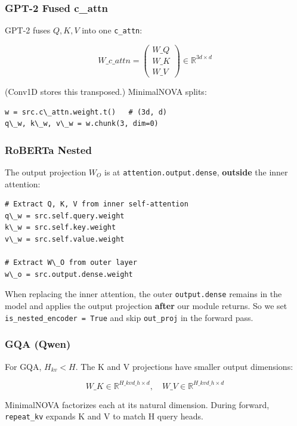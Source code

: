 \subsubsection{GPT-2 Fused c\_attn}

GPT-2 fuses $Q, K, V$ into one \texttt{c\_attn}:

\[
W\_{c\_attn} = \begin{pmatrix} W\_Q \\ W\_K \\ W\_V \end{pmatrix} \in \mathbb{R}^{3d \times d}
\tag{4.6}
\]

(Conv1D stores this transposed.) MinimalNOVA splits:

\begin{lstlisting}
w = src.c\_attn.weight.t()   # (3d, d)
q\_w, k\_w, v\_w = w.chunk(3, dim=0)
\end{lstlisting}

\subsubsection{RoBERTa Nested}

The output projection $W_O$ is at \texttt{attention.output.dense}, \textbf{outside} the 
inner attention:

\begin{lstlisting}
# Extract Q, K, V from inner self-attention
q\_w = src.self.query.weight
k\_w = src.self.key.weight
v\_w = src.self.value.weight

# Extract W\_O from outer layer
w\_o = src.output.dense.weight
\end{lstlisting}

When replacing the inner attention, the outer \texttt{output.dense} remains in 
the model and applies the output projection \textbf{after} our module returns. 
So we set \texttt{is\_nested\_encoder = True} and skip \texttt{out\_proj} in the forward 
pass.

\subsubsection{GQA (Qwen)}

For GQA, $H_{kv} < H$. The K and V projections have smaller output 
dimensions:

\[
W\_K \in \mathbb{R}^{H\_{kv} d\_h \times d}, \quad
W\_V \in \mathbb{R}^{H\_{kv} d\_h \times d}
\tag{4.7}
\]

MinimalNOVA factorizes each at its natural dimension. During forward, 
\texttt{repeat\_kv} expands K and V to match H query heads.


